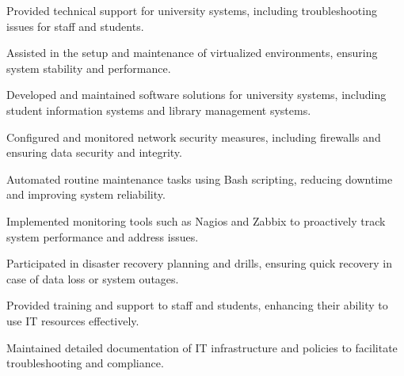 \begin{resume_list}
    \item Provided technical support for university systems, including troubleshooting issues for staff and students.
    \item Assisted in the setup and maintenance of virtualized environments, ensuring system stability and performance.
    \item Developed and maintained software solutions for university systems, including student information systems and library management systems.
    \item Configured and monitored network security measures, including firewalls and ensuring data security and integrity.
    \item Automated routine maintenance tasks using Bash scripting, reducing downtime and improving system reliability.
    \item Implemented monitoring tools such as Nagios and Zabbix to proactively track system performance and address issues.
    \item Participated in disaster recovery planning and drills, ensuring quick recovery in case of data loss or system outages.
    \item Provided training and support to staff and students, enhancing their ability to use IT resources effectively.
    \item Maintained detailed documentation of IT infrastructure and policies to facilitate troubleshooting and compliance.
\end{resume_list}
